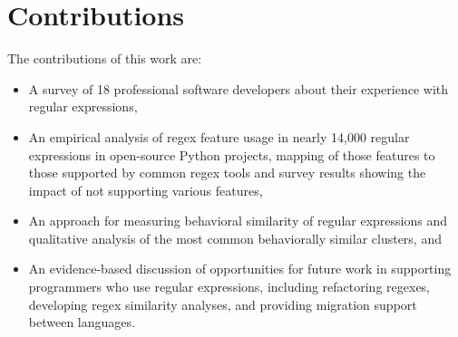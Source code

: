 \section{Contributions}

The contributions of this work are:
\begin{itemize} \setlength \itemsep{.1pt}
    \item A survey of 18 professional software developers about their experience with regular expressions,
    \item An empirical analysis of regex feature usage in nearly 14,000 regular expressions in  open-source Python projects, mapping of those features to those supported by common regex tools and survey results showing the impact of not supporting various features,
    \item An approach for measuring behavioral similarity of regular expressions and qualitative analysis of the most common behaviorally similar clusters, and
    \item An evidence-based discussion of opportunities for future work in supporting programmers who use regular expressions, including refactoring regexes, developing regex similarity analyses, and providing migration support between languages.
\end{itemize}
